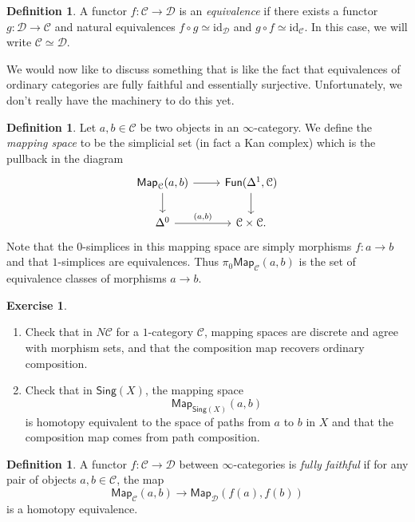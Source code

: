 \documentclass[10pt]{amsart}
\theoremstyle{definition}
\newtheorem{defn}[thm]{Definition}
\newtheorem{exer}[thm]{Exercise}
\theoremstyle{remark}
\theoremstyle{plain}
\theoremstyle{definition}
\theoremstyle{remark}
\newcommand{\mc}[1]{\mathcal{#1}}
\newcommand{\mr}[1]{\mathrm{#1}}
\newcommand{\ms}[1]{\mathsf{#1}}
\newcommand{\1}{\mathbf{1}}
\newcommand{\2}{\mathbf{2}}
\newcommand{\3}{\mathbf{3}}
\begin{document}
\begin{defn}
    A functor $f \colon \mc{C} \to \mc{D}$ is an \textit{equivalence} if there exists a functor $g \colon \mc{D} \to \mc{C}$ and natural equivalences $f \circ g \simeq \mr{id}_{\mc{D}}$ and $g \circ f \simeq \mr{id}_{\mc{C}}$. In this case, we will write $\mc{C} \simeq \mc{D}$.
\end{defn}

We would now like to discuss something that is like the fact that equivalences of ordinary categories are fully faithful and essentially surjective. Unfortunately, we don't really have the machinery to do this yet.

\begin{defn}
    Let $a,b \in \mc{C}$ be two objects in an $\infty$-category. We define the \textit{mapping space} to be the simplicial set (in fact a Kan complex) which is the pullback in the diagram
    \begin{equation*}
    \begin{tikzcd}
        \ms{Map}_{\mc{C}}(a,b) \ar{r} \ar{d} & \ms{Fun}(\Delta^1, \mc{C}) \ar{d} \\
        \Delta^0 \ar{r}{(a,b)} & \mc{C} \times \mc{C}.
    \end{tikzcd}
    \end{equation*}
    Note that the $0$-simplices in this mapping space are simply morphisms $f \colon a \to b$ and that $1$-simplices are equivalences. Thus $\pi_0 \ms{Map}_{\mc{C}}(a,b)$ is the set of equivalence classes of morphisms $a \to b$.
\end{defn}

\begin{exer}\leavevmode
    \begin{enumerate}
        \item Check that in $N\mc{C}$ for a $1$-category $\mc{C}$, mapping spaces are discrete and agree with morphism sets, and that the composition map recovers ordinary composition.
        \item Check that in $\ms{Sing}(X)$, the mapping space
        \[ \ms{Map}_{\ms{Sing}(X)}(a,b) \]
        is homotopy equivalent to the space of paths from $a$ to $b$ in $X$ and that the composition map comes from path composition.
    \end{enumerate}
\end{exer}

\begin{defn}
    A functor $f \colon \mc{C} \to \mc{D}$ between $\infty$-categories is \textit{fully faithful} if for any pair of objects $a,b \in \mc{C}$, the map
    \[ \ms{Map}_{\mc{C}}(a,b) \to \ms{Map}_{\mc{D}}(f(a), f(b)) \]
    is a homotopy equivalence.
\end{defn}
\end{document}
